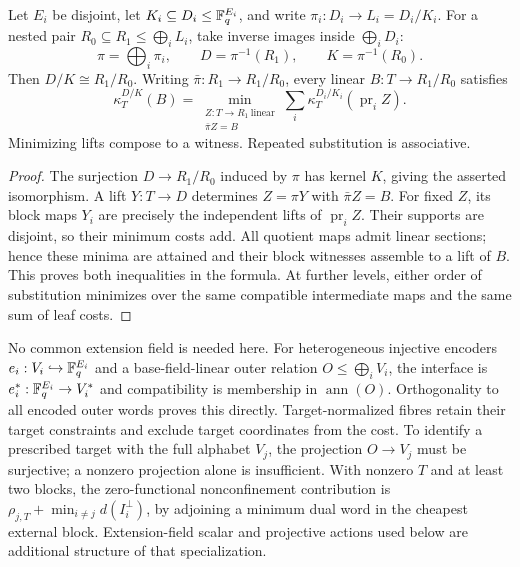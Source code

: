 \begin{theorem}
\label{thm:quotient-lifting-composition}
%
Let $E_i$ be disjoint, let $K_i\subseteq D_i\leq\mathbb F_q^{E_i}$, and write
$\pi_i:D_i\to L_i=D_i/K_i$.  For a nested pair
$R_0\subseteq R_1\leq\bigoplus_iL_i$, take inverse images inside
$\bigoplus_iD_i$:
\[
 \pi=\bigoplus_i\pi_i,\qquad D=\pi^{-1}(R_1),\qquad K=\pi^{-1}(R_0).
\]
Then $D/K\cong R_1/R_0$.  Writing $\bar\pi:R_1\to R_1/R_0$, every
linear $B:T\to R_1/R_0$ satisfies
\begin{equation}
 \kappa_T^{D/K}(B)=
 \min_{\substack{Z:T\to R_1\ \mathrm{linear}\\\bar\pi Z=B}}
 \sum_i\kappa_T^{D_i/K_i}(\operatorname{pr}_iZ).
 \label{eq:quotient-lifting-composition}
\end{equation}
Minimizing lifts compose to a witness.  Repeated substitution is associative.
\end{theorem}

\begin{proof}
The surjection $D\to R_1/R_0$ induced by $\pi$ has kernel $K$, giving
the asserted isomorphism.  A lift $Y:T\to D$ determines $Z=\pi Y$ with
$\bar\pi Z=B$.  For fixed $Z$, its block maps $Y_i$ are precisely the
independent lifts of $\operatorname{pr}_iZ$.  Their supports are disjoint,
so their minimum costs add.  All quotient maps admit linear sections;
hence these minima are attained and their block witnesses assemble to a
lift of $B$.  This proves both inequalities in the formula.  At further
levels, either order of substitution minimizes over the same compatible
intermediate maps and the same sum of leaf costs.
%
\end{proof}

No common extension field is needed here.  For heterogeneous injective
encoders $e_i:V_i\hookrightarrow\mathbb F_q^{E_i}$ and a base-field-linear
outer relation $O\leq\bigoplus_iV_i$, the interface is
$e_i^*:\mathbb F_q^{E_i}\to V_i^*$ and compatibility is membership in
$\operatorname{ann}(O)$.  Orthogonality to all encoded outer words proves
this directly.  Target-normalized fibres retain their target constraints
and exclude target coordinates from the cost.  To identify a prescribed
target with the full alphabet $V_j$, the projection $O\to V_j$ must be
surjective; a nonzero projection alone is insufficient.  With nonzero $T$
and at least two blocks, the zero-functional nonconfinement contribution is
$\rho_{j,T}+\min_{i\ne j}d(I_i^\perp)$, by adjoining a minimum dual word
in the cheapest external block.  Extension-field scalar and projective
actions used below are additional structure of that specialization.

